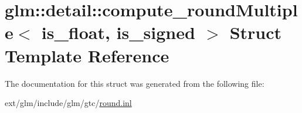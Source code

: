 \hypertarget{structglm_1_1detail_1_1compute__round_multiple}{\section{glm\-:\-:detail\-:\-:compute\-\_\-round\-Multiple$<$ is\-\_\-float, is\-\_\-signed $>$ Struct Template Reference}
\label{structglm_1_1detail_1_1compute__round_multiple}
}


The documentation for this struct was generated from the following file\-:\begin{DoxyCompactItemize}
\item 
ext/glm/include/glm/gtc/\hyperlink{round_8inl}{round.\-inl}\end{DoxyCompactItemize}
